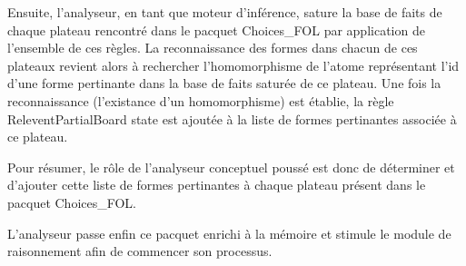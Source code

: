 Ensuite, l'analyseur, en tant que moteur d'inférence, sature la base de faits de chaque plateau rencontré dans le pacquet Choices\_FOL par application de l'ensemble de ces règles. La reconnaissance des formes dans chacun de ces plateaux revient alors à rechercher l'homomorphisme de l'atome représentant l'id d'une forme pertinante dans la base de faits saturée de ce plateau. Une fois la reconnaissance (l'existance d'un homomorphisme) est établie, la règle ReleventPartialBoard state est ajoutée à la liste de formes pertinantes associée à ce plateau.

Pour résumer, le rôle de l'analyseur conceptuel poussé est donc de déterminer et d'ajouter cette liste de formes pertinantes à chaque plateau présent dans le pacquet Choices\_FOL. 

L'analyseur passe enfin ce pacquet enrichi à la mémoire et stimule le module de raisonnement afin de commencer son processus. 
